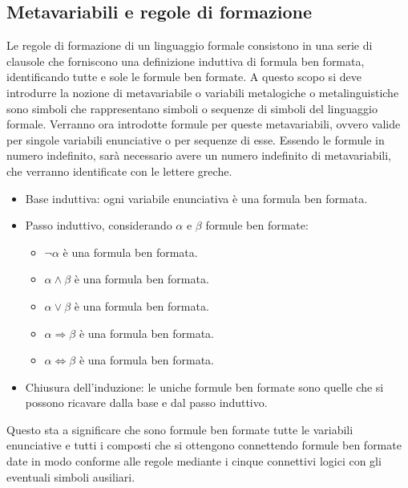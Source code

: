 \subsection{Metavariabili e regole di formazione}
Le regole di formazione di un linguaggio formale consistono in una serie di clausole che forniscono una definizione induttiva di formula ben formata, identificando tutte e sole le  formule ben formate. A questo 
scopo si deve introdurre la nozione di metavariabile o variabili metalogiche o metalinguistiche sono simboli che rappresentano simboli o sequenze di simboli del linguaggio formale. Verranno ora introdotte 
formule per queste metavariabili, ovvero valide per singole variabili enunciative o per sequenze di esse. Essendo le formule in numero indefinito, sar\`a necessario avere un numero indefinito di 
metavariabili, che verranno identificate con le lettere greche. 
\begin{itemize}
\item Base induttiva: ogni variabile enunciativa \`e una formula ben formata.
\item Passo induttivo, considerando $\alpha$ e $\beta$ formule ben formate:
\begin{itemize}
\item $\neg\alpha$ \`e una formula ben formata.
\item $\alpha\land\beta$ \`e una formula ben formata.
\item $\alpha\lor\beta$ \`e una formula ben formata.
\item $\alpha\Rightarrow\beta$ \`e una formula ben formata.
\item $\alpha\Leftrightarrow\beta$ \`e una formula ben formata.
\end{itemize}
\item Chiusura dell'induzione: le uniche formule ben formate sono quelle che si possono ricavare dalla base e dal passo induttivo.
\end{itemize}
Questo sta a significare che sono formule ben formate tutte le variabili enunciative e tutti i composti che si ottengono connettendo formule ben formate date in modo conforme alle regole mediante i cinque 
connettivi logici con gli eventuali simboli ausiliari. 
